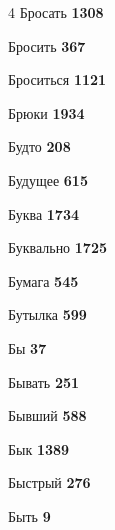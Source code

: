 \begin{multicols}{4}
\noindent Бросать \dotfill \textbf{\color{secondary} 1308}\par
\noindent Бросить \dotfill \textbf{\color{secondary} 367}\par
\noindent Броситься \dotfill \textbf{\color{secondary} 1121}\par
\noindent Брюки \dotfill \textbf{\color{secondary} 1934}\par
\noindent Будто \dotfill \textbf{\color{secondary} 208}\par
\noindent Будущее \dotfill \textbf{\color{secondary} 615}\par
\noindent Буква \dotfill \textbf{\color{secondary} 1734}\par
\noindent Буквально \dotfill \textbf{\color{secondary} 1725}\par
\noindent Бумага \dotfill \textbf{\color{secondary} 545}\par
\noindent Бутылка \dotfill \textbf{\color{secondary} 599}\par
\noindent Бы \dotfill \textbf{\color{secondary} 37}\par
\noindent Бывать \dotfill \textbf{\color{secondary} 251}\par
\noindent Бывший \dotfill \textbf{\color{secondary} 588}\par
\noindent Бык \dotfill \textbf{\color{secondary} 1389}\par
\noindent Быстрый \dotfill \textbf{\color{secondary} 276}\par
\noindent Быть \dotfill \textbf{\color{secondary} 9}\par


\end{multicols}
